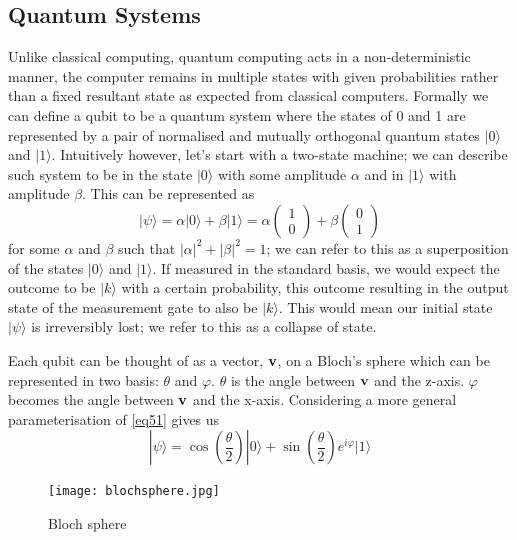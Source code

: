 \documentclass[12pt]{article}
\newcommand{\newp}
    {
    \vskip 0.5cm 
  }
\numberwithin{equation}{section}
\begin{document}
\subsection{Quantum Systems}
Unlike classical computing, quantum computing acts in a non-deterministic manner,
the computer remains in multiple states with given probabilities rather than a
fixed resultant state as expected from classical computers. Formally we can define 
a qubit to be a quantum system where the states of 0 and 1 are represented by a pair 
of normalised and mutually orthogonal quantum states $|0\rangle$ and $|1\rangle$. 
Intuitively however, let's start with a two-state machine; 
we can describe such system to be in the state 
$|0\rangle$ with some amplitude $\alpha$ and in $|1\rangle$ with amplitude $\beta$. 
This can be represented  as
\begin{equation}\label{eq51}
  |\psi\rangle = \alpha|0\rangle + \beta|1\rangle = \alpha\begin{pmatrix} 
    1\\0\end{pmatrix} + \beta\begin{pmatrix}0\\1\end{pmatrix}
\end{equation}
for 
some $\alpha$ and $\beta$ such that $|\alpha|^2+|\beta|^2 = 1$; 
we can refer to this as a superposition of the states $|0\rangle$ and $|1\rangle$. 
If measured in the standard basis, we would expect the outcome to be $|k\rangle$ 
with a certain probability, this outcome resulting in the output state of the 
measurement gate to also be $|k\rangle$. This would mean our initial state $|\psi\rangle$
is irreversibly lost; we refer to this as a collapse of state.
\newp 
Each qubit can 
be thought of as a vector, $\bold{v}$, on a Bloch's sphere which can be represented in two 
basis: $\theta$ and $\varphi$. $\theta$ is the angle between $\bold{v}$ and the 
z-axis. $\varphi$ becomes the angle between $\bold{v}$ and the x-axis. Considering 
a more general parameterisation of 
\ref{eq51} gives us 
\begin{equation}\label{hilbert1}
  |\psi\rangle = \cos (\frac{\theta}{2})|0\rangle + \sin(\frac{\theta}
  {2})e^{i\varphi}|1\rangle
\end{equation}
\begin{figure}[h!]
  \centering 
  \texttt{[image: blochsphere.jpg]}
  \caption{Bloch sphere}
  \label{fig:bloch}
\end{figure}
\newp 
\end{document}
